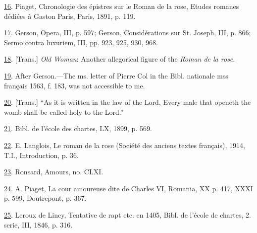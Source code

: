 \protect\hypertarget{23_NOTES.xhtmlux5cux23id_1457}{\protect\hyperlink{11_Chapter_Four__THE_FORMS_OF_LOVE.xhtmlux5cux23id_1456}{16}}.
Piaget, Chronologie des épistres sur le Roman de la rose, Etudes romanes
dédiées à Gaston Paris, Paris, 1891, p. 119.

\protect\hypertarget{23_NOTES.xhtmlux5cux23id_1455}{\protect\hyperlink{11_Chapter_Four__THE_FORMS_OF_LOVE.xhtmlux5cux23id_1454}{17}}.
Gerson, Opera, III, p. 597; Gerson, Considérations sur St. Joseph, III,
p. 866; Sermo contra luxuriem, III, pp. 923, 925, 930, 968.

\protect\hypertarget{23_NOTES.xhtmlux5cux23id_1453}{\protect\hyperlink{11_Chapter_Four__THE_FORMS_OF_LOVE.xhtmlux5cux23id_1452}{18}}.
{[}Trans.{]} \emph{Old Woman}: Another allegorical figure of the
\emph{Roman de la rose}.

\protect\hypertarget{23_NOTES.xhtmlux5cux23id_1451}{\protect\hyperlink{11_Chapter_Four__THE_FORMS_OF_LOVE.xhtmlux5cux23id_1450}{19}}.
After Gerson.---The ms. letter of Pierre Col in the Bibl. nationale mss
français 1563, f. 183, was not accessible to me.

\protect\hypertarget{23_NOTES.xhtmlux5cux23id_1449}{\protect\hyperlink{11_Chapter_Four__THE_FORMS_OF_LOVE.xhtmlux5cux23id_1448}{20}}.
{[}Trans.{]} ``As it is written in the law of the Lord, Every male that
openeth the womb shall be called holy to the Lord.''

\protect\hypertarget{23_NOTES.xhtmlux5cux23id_1447}{\protect\hyperlink{11_Chapter_Four__THE_FORMS_OF_LOVE.xhtmlux5cux23id_1446}{21}}.
Bibl. de l'école des chartes, LX, 1899, p. 569.

\protect\hypertarget{23_NOTES.xhtmlux5cux23id_1445}{\protect\hyperlink{11_Chapter_Four__THE_FORMS_OF_LOVE.xhtmlux5cux23id_1444}{22}}.
E. Langlois, Le roman de la rose (Société des anciens textes français),
1914, T.I., Introduction, p. 36.

\protect\hypertarget{23_NOTES.xhtmlux5cux23id_1443}{\protect\hyperlink{11_Chapter_Four__THE_FORMS_OF_LOVE.xhtmlux5cux23id_1442}{23}}.
Ronsard, Amours, no. CLXI.

\protect\hypertarget{23_NOTES.xhtmlux5cux23id_1441}{\protect\hyperlink{11_Chapter_Four__THE_FORMS_OF_LOVE.xhtmlux5cux23id_1440}{24}}.
A. Piaget, La cour amoureuse dite de Charles VI, Romania, XX p. 417,
XXXI p. 599, Doutrepont, p. 367.

\protect\hypertarget{23_NOTES.xhtmlux5cux23id_1439}{\protect\hyperlink{11_Chapter_Four__THE_FORMS_OF_LOVE.xhtmlux5cux23id_1438}{25}}.
Leroux de Lincy, Tentative de rapt etc. en 1405, Bibl. de l'école de
chartes, 2. serie, III, 1846, p. 316.

